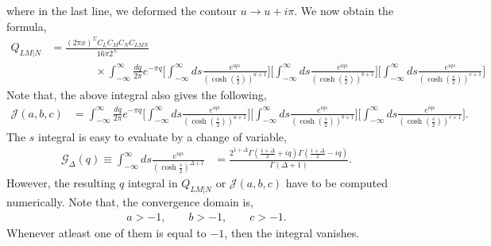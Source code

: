 \documentclass[11pt]{article}
\newcommand{\nn}{\nonumber}
\newcommand{\lb}{\left(}
\newcommand{\rb}{\right)}
\begin{document}
where in the last line, we deformed the contour $u \to u + i\pi$. We now obtain the formula,
\begin{align}
    Q_{LM|N}&= \frac{(2\pi x)^\Sigma C_LC_MC_NC_{LMN}}{16\pi 2^\Sigma} \nn\\&\qquad\qquad\times\int_{-\infty}^\infty\frac{dq}{2\pi}e^{-\pi q}  \Bigg[\int_{-\infty}^\infty ds\frac{e^{iqs}}{\lb\cosh\lb\frac{s}{2}\rb\rb^{a+1}}\Bigg]\Bigg[\int_{-\infty}^\infty ds\frac{e^{iqs}}{\lb\cosh\lb\frac{s}{2}\rb\rb^{b+1}}\Bigg] \Bigg[\int_{-\infty}^\infty ds\frac{e^{iqs}}{\lb\cosh\lb\frac{s}{2}\rb\rb^{c+1}}\Bigg]
\end{align}
Note that, the above integral also gives the following,
\begin{align}
    \mathcal{J}(a,b,c) &= \int_{-\infty}^\infty\frac{dq}{2\pi}e^{-\pi q}  \Bigg[\int_{-\infty}^\infty ds\frac{e^{iqs}}{\lb\cosh\lb\frac{s}{2}\rb\rb^{a+1}}\Bigg]\Bigg[\int_{-\infty}^\infty ds\frac{e^{iqs}}{\lb\cosh\lb\frac{s}{2}\rb\rb^{b+1}}\Bigg] \Bigg[\int_{-\infty}^\infty ds\frac{e^{iqs}}{\lb\cosh\lb\frac{s}{2}\rb\rb^{c+1}}\Bigg].
\end{align}
The $s$ integral is easy to evaluate by a change of variable, 
\begin{align}
    \mathcal{G}_\Delta(q)\equiv \int_{-\infty}^\infty ds \frac{e^{iqs}}{\lb\cosh\frac{s}{2}\rb^{\Delta +1}} &= \frac{2^{1+\Delta}\Gamma\lb\frac{1+\Delta}{2}+ iq\rb\Gamma\lb\frac{1+\Delta}{2}-iq\rb}{\Gamma\lb\Delta +1\rb}.
\end{align}
However, the resulting $q$ integral in $Q_{LM|N}$ or $\mathcal{J}(a,b,c)$ have to be computed numerically. Note that, the convergence domain is,
\begin{align}
    a>-1, \qquad b>-1, \qquad c>-1. 
\end{align}
Whenever atleast one of them is equal to $-1$, then the integral vanishes.
\end{document}
